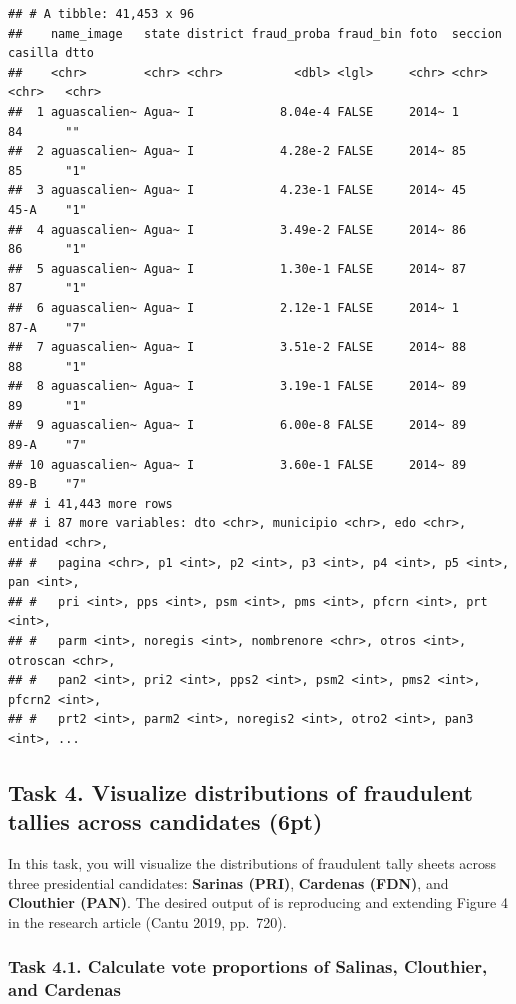 \documentclass[
]{article}
\begin{document}
\begin{verbatim}
## # A tibble: 41,453 x 96
##    name_image   state district fraud_proba fraud_bin foto  seccion casilla dtto 
##    <chr>        <chr> <chr>          <dbl> <lgl>     <chr> <chr>   <chr>   <chr>
##  1 aguascalien~ Agua~ I            8.04e-4 FALSE     2014~ 1       84      ""   
##  2 aguascalien~ Agua~ I            4.28e-2 FALSE     2014~ 85      85      "1"  
##  3 aguascalien~ Agua~ I            4.23e-1 FALSE     2014~ 45      45-A    "1"  
##  4 aguascalien~ Agua~ I            3.49e-2 FALSE     2014~ 86      86      "1"  
##  5 aguascalien~ Agua~ I            1.30e-1 FALSE     2014~ 87      87      "1"  
##  6 aguascalien~ Agua~ I            2.12e-1 FALSE     2014~ 1       87-A    "7"  
##  7 aguascalien~ Agua~ I            3.51e-2 FALSE     2014~ 88      88      "1"  
##  8 aguascalien~ Agua~ I            3.19e-1 FALSE     2014~ 89      89      "1"  
##  9 aguascalien~ Agua~ I            6.00e-8 FALSE     2014~ 89      89-A    "7"  
## 10 aguascalien~ Agua~ I            3.60e-1 FALSE     2014~ 89      89-B    "7"  
## # i 41,443 more rows
## # i 87 more variables: dto <chr>, municipio <chr>, edo <chr>, entidad <chr>,
## #   pagina <chr>, p1 <int>, p2 <int>, p3 <int>, p4 <int>, p5 <int>, pan <int>,
## #   pri <int>, pps <int>, psm <int>, pms <int>, pfcrn <int>, prt <int>,
## #   parm <int>, noregis <int>, nombrenore <chr>, otros <int>, otroscan <chr>,
## #   pan2 <int>, pri2 <int>, pps2 <int>, psm2 <int>, pms2 <int>, pfcrn2 <int>,
## #   prt2 <int>, parm2 <int>, noregis2 <int>, otro2 <int>, pan3 <int>, ...
\end{verbatim}

\clearpage

\hypertarget{task-4.-visualize-distributions-of-fraudulent-tallies-across-candidates-6pt}{%
\subsection{Task 4. Visualize distributions of fraudulent tallies across
candidates
(6pt)}\label{task-4.-visualize-distributions-of-fraudulent-tallies-across-candidates-6pt}}

In this task, you will visualize the distributions of fraudulent tally
sheets across three presidential candidates: \textbf{Sarinas (PRI)},
\textbf{Cardenas (FDN)}, and \textbf{Clouthier (PAN)}. The desired
output of is reproducing and extending Figure 4 in the research article
(Cantu 2019, pp.~720).

\hypertarget{task-4.1.-calculate-vote-proportions-of-salinas-clouthier-and-cardenas}{%
\subsubsection{Task 4.1. Calculate vote proportions of Salinas,
Clouthier, and
Cardenas}\label{task-4.1.-calculate-vote-proportions-of-salinas-clouthier-and-cardenas}}
\end{document}

